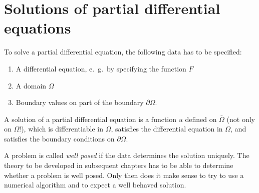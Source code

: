 %
%
%
\section{Solutions of partial differential equations\label{klassifikation:loesung}}
To solve a partial differential equation, the following data has to be
specified:
\begin{enumerate}
\item
A differential equation, e.~g.~by specifying the function $F$
\item
A domain $\Omega$
\item
Boundary values on part of the boundary $\partial\Omega$.
\end{enumerate}
\begin{definition}
A solution of a partial differential equation is a function $u$
defined on $\bar \Omega$ (not only on $\Omega$!), which is
differentiable in $\Omega$, satisfies the differential equation in
$\Omega$, and satisfies the boundary conditions on $\partial\Omega$.
\end{definition}

A problem is called {\em well posed} if the data determines the solution
uniquely.
The theory to be developed in subsequent chapters has to be able to
determine whether a problem is well posed.
Only then does it make sense to try to use a numerical algorithm
and to expect a well behaved solution.

